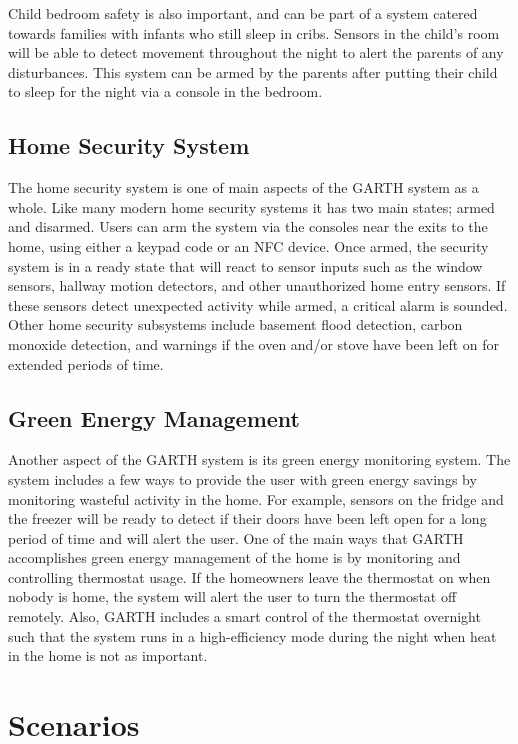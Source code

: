 \documentclass{report}
\begin{document}
Child bedroom safety is also important, and can be part of a system catered 
towards families with infants who still sleep in cribs. Sensors in the child's room 
will be able to detect movement throughout the night to alert the parents of any 
disturbances. This system can be armed by the parents after putting their child
to sleep for the night via a console in the bedroom.

\subsection{Home Security System}

The home security system is one of main aspects of the GARTH system as a
whole. Like many modern home security systems it has two main states; armed
and disarmed. Users can arm the system via the consoles near the exits to the
home, using either a keypad code or an NFC device. Once armed, the security
system is in a ready state that will react to sensor inputs such as the window
sensors, hallway motion detectors, and other unauthorized home entry sensors.
If these sensors detect unexpected activity while armed, a critical alarm is sounded.
Other home security subsystems include basement flood detection, carbon 
monoxide detection, and warnings if the oven and/or stove have been left on
for extended periods of time.

\subsection{Green Energy Management}

Another aspect of the GARTH system is its green energy monitoring system. The
system includes a few ways to provide the user with green energy savings by
monitoring wasteful activity in the home. For example, sensors on the fridge and 
the freezer will be ready to detect if their doors have been left open for a long period
of time and will alert the user. One of the main ways that GARTH accomplishes
green energy management of the home is by monitoring and controlling thermostat 
usage. If the homeowners leave the thermostat on when nobody is home, the
system will alert the user to turn the thermostat off remotely. Also, GARTH includes
a smart control of the thermostat overnight such that the system runs in a high-efficiency
mode during the night when heat in the home is not as important.

\section{Scenarios}
\end{document}
